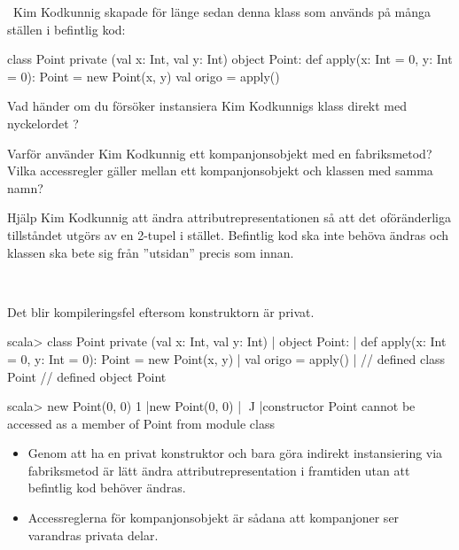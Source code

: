 \QUESTEND






\clearpage

\AdvancedTasks %



\QUESTBEGIN

\Task \what~Kim Kodkunnig skapade för länge sedan denna klass som används på många ställen i befintlig kod:

\begin{Code}
class Point private (val x: Int, val y: Int)
object Point:
  def apply(x: Int = 0, y: Int = 0): Point = new Point(x, y)
  val origo = apply()
\end{Code}

\Subtask Vad händer om du försöker instansiera Kim Kodkunnigs klass direkt med nyckelordet ?

\Subtask Varför använder Kim Kodkunnig ett kompanjonsobjekt med en fabriksmetod? Vilka accessregler gäller mellan ett kompanjonsobjekt och klassen med samma namn?

\Subtask Hjälp Kim Kodkunnig att ändra attributrepresentationen så att det oföränderliga tillståndet utgörs av en 2-tupel  i stället. Befintlig kod ska inte behöva ändras och klassen  ska bete sig från ''utsidan'' precis som innan.

\SOLUTION

\TaskSolved \what~

\SubtaskSolved Det blir kompileringsfel eftersom konstruktorn är privat.
\begin{REPL}
scala> class Point private (val x: Int, val y: Int)
     | object Point:
     |   def apply(x: Int = 0, y: Int = 0): Point = new Point(x, y)
     |   val origo = apply()
     |
// defined class Point
// defined object Point

scala> new Point(0, 0)
1 |new Point(0, 0)
  |    ^^^^^
  |constructor Point cannot be accessed as a member of Point from module class
\end{REPL}

\SubtaskSolved
\begin{itemize}
  \item Genom att ha en privat konstruktor och bara göra indirekt instansiering via fabriksmetod är lätt ändra attributrepresentation i framtiden utan att befintlig kod behöver ändras.

  \item Accessreglerna för kompanjonsobjekt är sådana att kompanjoner ser varandras privata delar.
\end{itemize}


